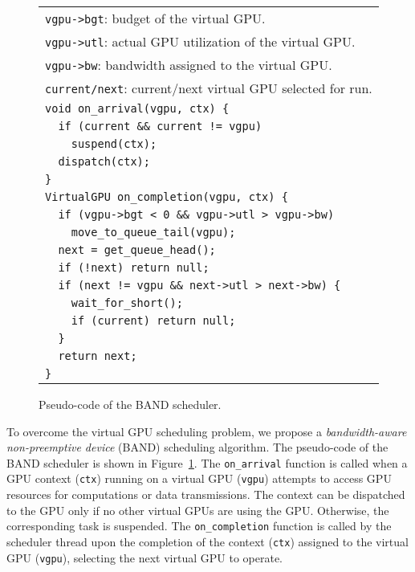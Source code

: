 \begin{figure}[t]
 \begin{center}
  \begin{tabular}{l}
   \hline
   {\small \verb|vgpu->bgt|: budget of the virtual GPU.}\\
   {\small \verb|vgpu->utl|: actual GPU utilization of the virtual GPU.}\\
   {\small \verb|vgpu->bw|: bandwidth assigned to the virtual
   GPU.}\\
   {\small \verb|current/next|: current/next virtual GPU selected for run.}\\
   \hline
   {\small \verb|void on_arrival(vgpu, ctx) {|}\\
   {\small \verb|  if (current && current != vgpu)|}\\
   {\small \verb|    suspend(ctx);|}\\
   {\small \verb|  dispatch(ctx);|}\\
   {\small \verb|}|}\\
   {\small \verb|VirtualGPU on_completion(vgpu, ctx) {|}\\
   {\small \verb|  if (vgpu->bgt < 0 && vgpu->utl > vgpu->bw)|}\\
   {\small \verb|    move_to_queue_tail(vgpu);|}\\
   {\small \verb|  next = get_queue_head();|}\\
   {\small \verb|  if (!next) return null;|}\\
   {\small \verb|  if (next != vgpu && next->utl > next->bw) {|}\\
   {\small \verb|    wait_for_short();|}\\
   {\small \verb|    if (current) return null;|}\\
   {\small \verb|  }|}\\
   {\small \verb|  return next;|}\\
   {\small \verb|}|}\\
   \hline
  \end{tabular}
  \caption{Pseudo-code of the BAND scheduler.}
  \label{fig:band}
 \end{center}
 \vspace{-1.7em}
\end{figure}

To overcome the virtual GPU scheduling problem, we propose a
\textit{bandwidth-aware non-preemptive device} (BAND) scheduling
algorithm.
The pseudo-code of the BAND scheduler is shown in
Figure~\ref{fig:band}.
The \texttt{on\_arrival} function is called when a GPU context
(\texttt{ctx}) running on a virtual GPU (\texttt{vgpu}) attempts to
access GPU resources for computations or data transmissions.
The context can be dispatched to the GPU only if no other virtual GPUs
are using the GPU.
Otherwise, the corresponding task is suspended.
The \texttt{on\_completion} function is called by the scheduler thread
upon the completion of the context (\texttt{ctx}) assigned to the
virtual GPU (\texttt{vgpu}), selecting the next virtual GPU to operate.

